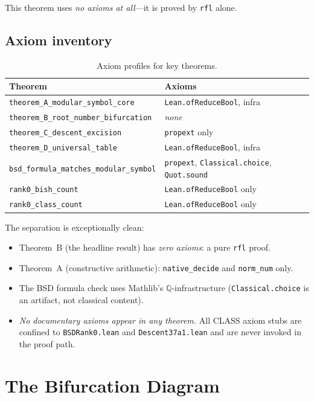 \documentclass[11pt]{article}
\theoremstyle{plain}
\theoremstyle{definition}
\theoremstyle{remark}
\newcommand{\Q}{\mathbb{Q}}
\begin{document}
This theorem uses \emph{no axioms at all}---it is proved by \texttt{rfl} alone.

\subsection{Axiom inventory}

\begin{table}[ht]
\centering
\caption{Axiom profiles for key theorems.}\label{tab:axioms}
\begin{tabular}{l l}
\toprule
\textbf{Theorem} & \textbf{Axioms} \\
\midrule
\texttt{theorem\_A\_modular\_symbol\_core} & \texttt{Lean.ofReduceBool}, infra \\
\texttt{theorem\_B\_root\_number\_bifurcation} & \emph{none} \\
\texttt{theorem\_C\_descent\_excision} & \texttt{propext} only \\
\texttt{theorem\_D\_universal\_table} & \texttt{Lean.ofReduceBool}, infra \\
\texttt{bsd\_formula\_matches\_modular\_symbol} & \texttt{propext}, \texttt{Classical.choice}, \texttt{Quot.sound} \\
\texttt{rank0\_bish\_count} & \texttt{Lean.ofReduceBool} only \\
\texttt{rank0\_class\_count} & \texttt{Lean.ofReduceBool} only \\
\bottomrule
\end{tabular}
\end{table}

\noindent The separation is exceptionally clean:
\begin{itemize}[nosep]
\item Theorem~B (the headline result) has \emph{zero axioms}: a pure \texttt{rfl} proof.
\item Theorem~A (constructive arithmetic): \texttt{native\_decide} and \texttt{norm\_num} only.
\item The BSD formula check uses Mathlib's $\Q$-infrastructure (\texttt{Classical.choice} is an artifact, not classical content).
\item \emph{No documentary axioms appear in any theorem.} All CLASS axiom stubs are confined to \texttt{BSDRank0.lean} and \texttt{Descent37a1.lean} and are never invoked in the proof path.
\end{itemize}


\section{The Bifurcation Diagram}
\label{sec:figure}
\end{document}
